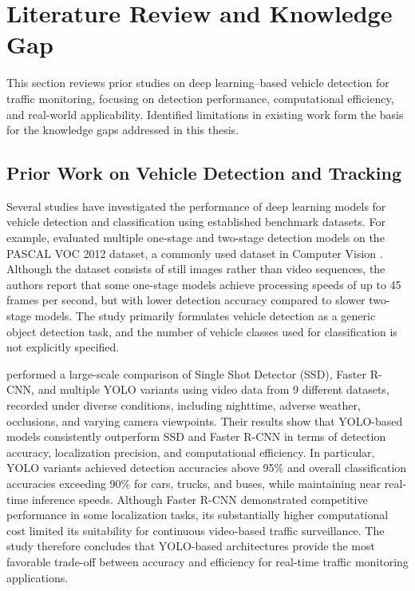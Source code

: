\section{Literature Review and Knowledge Gap}
\label{sec:literature_review_research_gap}

This section reviews prior studies on deep learning–based vehicle detection for traffic monitoring, focusing on detection performance, computational efficiency, and real-world applicability. Identified limitations in existing work form the basis for the knowledge gaps addressed in this thesis.

\subsection{Prior Work on Vehicle Detection and Tracking}
\label{sec:previous_work}
Several studies have investigated the performance of deep learning models for vehicle detection and classification using established benchmark datasets. For example, \cite{Ma2024} evaluated multiple one-stage and two-stage detection models on the PASCAL VOC 2012 dataset, a commonly used dataset in Computer Vision \citep{Everingham10,HuggingFacePascalVOC}. Although the dataset consists of still images rather than video sequences, the authors report that some one-stage models achieve processing speeds of up to 45 frames per second, but with lower detection accuracy compared to slower two-stage models. The study primarily formulates vehicle detection as a generic object detection task, and the number of vehicle classes used for classification is not explicitly specified.


\cite{smartcities6050134} performed a large-scale comparison of Single Shot Detector (SSD), Faster R-CNN, and multiple YOLO variants using video data from 9 different datasets, recorded under diverse conditions, including nighttime, adverse weather, occlusions, and varying camera viewpoints. Their results show that YOLO-based models consistently outperform SSD and Faster R-CNN in terms of detection accuracy, localization precision, and computational efficiency. In particular, YOLO variants achieved detection accuracies above 95\% and overall classification accuracies exceeding 90\% for cars, trucks, and buses, while maintaining near real-time inference speeds. Although Faster R-CNN demonstrated competitive performance in some localization tasks, its substantially higher computational cost limited its suitability for continuous video-based traffic surveillance. The study therefore concludes that YOLO-based architectures provide the most favorable trade-off between accuracy and efficiency for real-time traffic monitoring applications.

